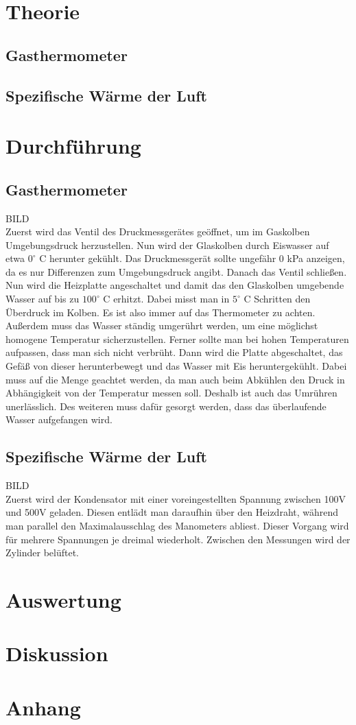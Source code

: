 \documentclass[12pt,a4paper,titlepage,headinclude,bibtotoc]{scrartcl}
\begin{document}
\section{Theorie}
\label{sec:theorie}
\subsection{Gasthermometer}

\subsection{Spezifische Wärme der Luft}

\section{Durchführung}
\label{sec:durchfuehrung}
\subsection{Gasthermometer}
BILD\\
Zuerst wird das Ventil des Druckmessgerätes geöffnet, um im Gaskolben Umgebungsdruck herzustellen. Nun wird der Glaskolben durch Eiswasser auf etwa $0^\circ$ C herunter gekühlt. Das Druckmessgerät sollte ungefähr 0 kPa anzeigen, da es nur Differenzen zum Umgebungsdruck angibt. Danach das Ventil schließen.\\
Nun wird die Heizplatte angeschaltet und damit das den Glaskolben umgebende Wasser auf bis zu $100^\circ$ C erhitzt.
Dabei misst man in $5^\circ$ C Schritten den Überdruck im Kolben.
Es ist also immer auf das Thermometer zu achten.
Außerdem muss das Wasser ständig umgerührt werden, um eine möglichst homogene Temperatur sicherzustellen.
Ferner sollte man bei hohen Temperaturen aufpassen, dass man sich nicht verbrüht.
Dann wird die Platte abgeschaltet, das Gefäß von dieser herunterbewegt und das Wasser mit Eis heruntergekühlt.
Dabei muss auf die Menge geachtet werden, da man auch beim Abkühlen den Druck in Abhängigkeit von der Temperatur messen soll.
Deshalb ist auch das Umrühren unerlässlich.
Des weiteren muss dafür gesorgt werden, dass das überlaufende Wasser aufgefangen wird. 
\subsection{Spezifische Wärme der Luft}
BILD\\
Zuerst wird der Kondensator mit einer voreingestellten Spannung zwischen 100V und 500V geladen. Diesen entlädt man daraufhin über den Heizdraht, während man parallel den Maximalausschlag des Manometers abliest. Dieser Vorgang wird für mehrere Spannungen je dreimal wiederholt. Zwischen den Messungen wird der Zylinder belüftet.

\section{Auswertung}
\label{sec:auswertung}


\section{Diskussion}
\label{sec:diskussion}

\section{Anhang}
\end{document}
